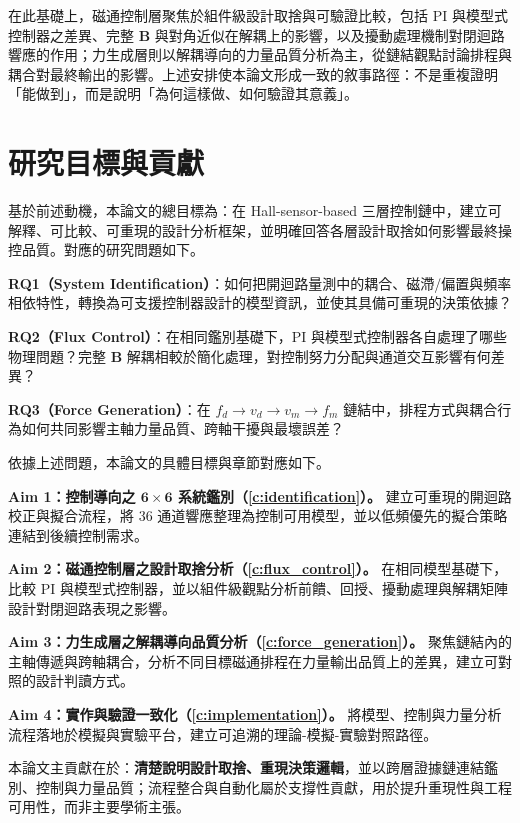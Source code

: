 在此基礎上，磁通控制層聚焦於組件級設計取捨與可驗證比較，包括 PI 與模型式控制器之差異、完整 $\mathbf{B}$ 與對角近似在解耦上的影響，以及擾動處理機制對閉迴路響應的作用；力生成層則以解耦導向的力量品質分析為主，從鏈結觀點討論排程與耦合對最終輸出的影響。上述安排使本論文形成一致的敘事路徑：不是重複證明「能做到」，而是說明「為何這樣做、如何驗證其意義」。

\section{研究目標與貢獻}
\label{sec:objectives}

基於前述動機，本論文的總目標為：在 Hall-sensor-based 三層控制鏈中，建立可解釋、可比較、可重現的設計分析框架，並明確回答各層設計取捨如何影響最終操控品質。對應的研究問題如下。

\textbf{RQ1（System Identification）}：如何把開迴路量測中的耦合、磁滯/偏置與頻率相依特性，轉換為可支援控制器設計的模型資訊，並使其具備可重現的決策依據？

\textbf{RQ2（Flux Control）}：在相同鑑別基礎下，PI 與模型式控制器各自處理了哪些物理問題？完整 $\mathbf{B}$ 解耦相較於簡化處理，對控制努力分配與通道交互影響有何差異？

\textbf{RQ3（Force Generation）}：在 $f_d\!\rightarrow\!v_d\!\rightarrow\!v_m\!\rightarrow\!f_m$ 鏈結中，排程方式與耦合行為如何共同影響主軸力量品質、跨軸干擾與最壞誤差？

依據上述問題，本論文的具體目標與章節對應如下。

\textbf{Aim 1：控制導向之 $\mathbf{6\times6}$ 系統鑑別（\cref{c:identification}）。}
建立可重現的開迴路校正與擬合流程，將 36 通道響應整理為控制可用模型，並以低頻優先的擬合策略連結到後續控制需求。

\textbf{Aim 2：磁通控制層之設計取捨分析（\cref{c:flux_control}）。}
在相同模型基礎下，比較 PI 與模型式控制器，並以組件級觀點分析前饋、回授、擾動處理與解耦矩陣設計對閉迴路表現之影響。

\textbf{Aim 3：力生成層之解耦導向品質分析（\cref{c:force_generation}）。}
聚焦鏈結內的主軸傳遞與跨軸耦合，分析不同目標磁通排程在力量輸出品質上的差異，建立可對照的設計判讀方式。

\textbf{Aim 4：實作與驗證一致化（\cref{c:implementation}）。}
將模型、控制與力量分析流程落地於模擬與實驗平台，建立可追溯的理論-模擬-實驗對照路徑。

本論文主貢獻在於：\textbf{清楚說明設計取捨、重現決策邏輯}，並以跨層證據鏈連結鑑別、控制與力量品質；流程整合與自動化屬於支撐性貢獻，用於提升重現性與工程可用性，而非主要學術主張。

